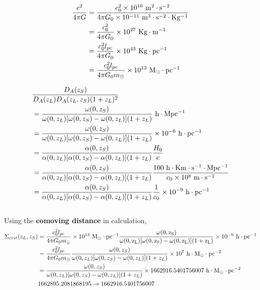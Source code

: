 \documentclass[12pt, a4paper]{article}
\begin{document}
\begin{align}
\frac{c^2}{4\pi G} 
&=\frac{c_0^2\times 10^{16}\ \rm{m^2\cdot s^{-2} }}{4\pi G_0\times 10^{-11}\  \rm{m^3\cdot s^{-2} \cdot Kg^{-1}}} \nonumber \\
&=\frac{c_0^2}{4\pi G_0}\times 10^{27} \ \rm{Kg \cdot m^{-1}} \nonumber \\
&=\frac{c_0^2 l_{pc}}{4\pi G_0}\times 10^{43} \ \rm{Kg \cdot pc^{-1}} \nonumber \\
&=\frac{c_0^2 l_{pc}}{4\pi G_0 m_{\odot}}\times 10^{13} \ \rm{M_{\odot} \cdot pc^{-1}} 
\end{align}

\begin{align}
&\frac{D_A (z_S)}{D_A (z_L) D_A (z_L, z_S) (1+z_L)^2} \nonumber \\
&=\frac{\omega(0,z_S)}{\omega(0,z_L)[\omega(0,z_S) - \omega(0,z_L)] (1+z_L)}\ \rm{h \cdot Mpc^{-1}} \\
&=\frac{\omega(0,z_S)}{\omega(0,z_L)[\omega(0,z_S) - \omega(0,z_L)] (1+z_L)}\times 10^{-6}\ \rm{h \cdot pc^{-1}} \\
&=\frac{\alpha(0,z_S)}{\alpha(0,z_L)[\alpha(0,z_S) - \alpha(0,z_L)] (1+z_L)}\frac{H_0}{c} \\
&=\frac{\alpha(0,z_S)}{\alpha(0,z_L)[\alpha(0,z_S) - \alpha(0,z_L)] (1+z_L)}\frac{100 \ \rm{h \cdot Km \cdot s^{-1} \cdot Mpc^{-1}}}{c_0\times 10^8 \ \rm{m \cdot s^{-1}}} \\
&=\frac{\alpha(0,z_S)}{\alpha(0,z_L)[\alpha(0,z_S) - \alpha(0,z_L)] (1+z_L)} \frac{1}{c_0} \times 10^{-9} \ \rm{h \cdot pc^{-1}}
\end{align}
\\

Using the \textbf{comoving distance} in calculation,
\begin{align}
\Sigma_{crit}(z_L, z_S) &= \frac{c_0^2 l_{pc}}{4\pi G_0 m_{\odot}}\times 10^{13} \ \rm{M_{\odot} \cdot pc^{-1}} \frac{\omega(0,z_S)}{\omega(0,z_L)[\omega(0,z_S) - \omega(0,z_L)] (1+z_L)}\times 10^{-6}\ \rm{h \cdot pc^{-1}} \nonumber\\
&=\frac{c_0^2 l_{pc}}{4\pi G_0 m_{\odot}}\frac{\omega(0,z_S)}{\omega(0,z_L)[\omega(0,z_S) - \omega(0,z_L)] (1+z_L)}\times 10^7 \ \rm{h \cdot M_{\odot}\cdot pc^{-2}} \nonumber\\
&=\frac{\omega(0,z_S)}{\omega(0,z_L)[\omega(0,z_S) - \omega(0,z_L)] (1+z_L)}\times  1662916.5401756007 \ \rm{h \cdot M_{\odot} \cdot pc^{-2}} \nonumber \\
&1662895.2081868195 \rightarrow 1662916.5401756007
\end{align}
\\
\end{document}
